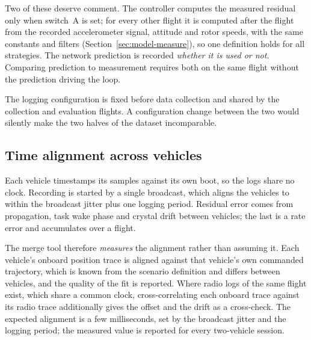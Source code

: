 Two of these deserve comment. The controller computes the measured residual only when switch~A is
set; for every other flight it is computed after the flight from the recorded accelerometer signal,
attitude and rotor speeds, with the same constants and filters (Section~\ref{sec:model-measure}),
so one definition holds for all strategies. The network prediction is recorded \emph{whether it is
used or not}. Comparing prediction to measurement requires both on the same flight without the
prediction driving the loop.

The logging configuration is fixed before data collection and shared by the collection and
evaluation flights. A configuration change between the two would silently make the two halves of
the dataset incomparable.

\subsection{Time alignment across vehicles}

Each vehicle timestamps its samples against its own boot, so the logs share no clock. Recording is
started by a single broadcast, which aligns the vehicles to within the broadcast jitter plus one
logging period. Residual error comes from propagation, task wake phase and crystal drift between
vehicles; the last is a rate error and accumulates over a flight.

The merge tool therefore \emph{measures} the alignment rather than assuming it. Each vehicle's
onboard position trace is aligned against that vehicle's own commanded trajectory, which is known
from the scenario definition and differs between vehicles, and the quality of the fit is reported.
Where radio logs of the same flight exist, which share a common clock, cross-correlating each
onboard trace against its radio trace additionally gives the offset and the drift as a
cross-check. The expected alignment is a few milliseconds, set by the broadcast jitter and the logging period; the measured value is reported for every two-vehicle session.

